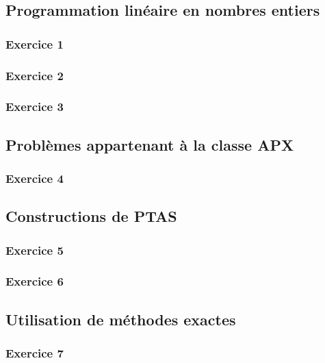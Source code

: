 \subsection{Programmation linéaire en nombres entiers}

\subsubsection*{Exercice 1}


\subsubsection*{Exercice 2}


\subsubsection*{Exercice 3}


\subsection{Problèmes appartenant à la classe APX}

\subsubsection*{Exercice 4}


\subsection{Constructions de PTAS}

\subsubsection*{Exercice 5}


\subsubsection*{Exercice 6}


\subsection{Utilisation de méthodes exactes}

\subsubsection*{Exercice 7}


